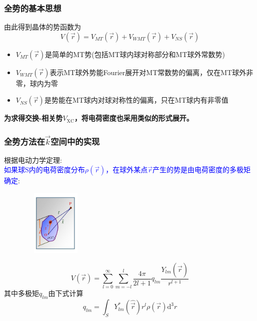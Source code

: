 {\frame
{
\frametitle{全势的基本思想}
由此得到晶体的势函数为
$$ V(\vec r)=V_{MT}(\vec r)+V_{WMT}(\vec r)+V_{NS}(\vec r)
  \label{eq:solid-64}
$$
\begin{itemize}
	\item $V_{MT}(\vec r)$是简单的\textrm{MT}势(包括\textrm{MT}球内球对称部分和\textrm{MT}球外常数势)
	\item $V_{WMT}(\vec r)$表示\textrm{MT}球外势能\textrm{Fourier}展开对\textrm{MT}常数势的偏离，仅在\textrm{MT}球外非零，球内为零
	\item $V_{NS}(\vec r)$是势能在\textrm{MT}球内对球对称性的偏离，只在\textrm{MT}球内有非零值
\end{itemize}
\textbf{\large 为求得交换-相关势$V_{\mathrm{XC}}$，将电荷密度也采用类似的形式展开。}
}

\frame
{
\frametitle{全势方法在$\vec k$空间中的实现}
根据电动力学定理:\\\textcolor{blue}{如果球\textrm{S}内的电荷密度分布$\rho(\vec r)$，在球外某点$\vec r$产生的势是由电荷密度的多极矩确定}:
\begin{figure}[h!]
\vspace*{-15pt}
\centering
\includegraphics[height=1.25in,width=1.32in,viewport=1 22 507 575,clip]{Figures/potential_multipole.jpg}
\label{Potential-multipole-copy2}
\end{figure}
\begin{displaymath}
	V(\vec r)=\sum_{l=0}^{\infty}\sum_{m=-l}^{l}\dfrac{4\pi}{2l+1}q_{lm}\dfrac{Y_{lm}(\hat{\vec r})}{r^{l+1}}
\end{displaymath}
其中多极矩$q_{lm}$由下式计算
\begin{displaymath}
	q_{lm}=\int_SY_{lm}^{\ast}(\hat{\vec r})r^l\rho(\vec r)\mathrm{d}^3r
\end{displaymath}
}

}

